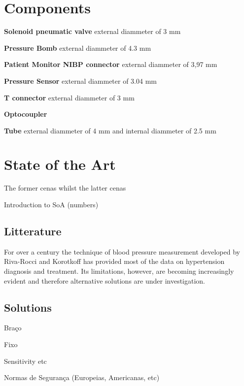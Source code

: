 \section{Components}

\textbf{Solenoid pneumatic valve}
external diammeter of 3 mm 

\textbf{Pressure Bomb}
external diammeter of 4.3 mm

\textbf{Patient Monitor NIBP connector}
external diammeter of 3,97 mm

\textbf{Pressure Sensor}
external diammeter of 3.04 mm

\textbf{T connector }
external diammeter of 3 mm

\textbf{Optocoupler}

\textbf{Tube}
external diammeter of 4 mm and internal diammeter of 2.5 mm


\section{State of the Art}

The former cenas whilst the latter cenas

Introduction to SoA (numbers)


\subsection{Litterature}

For over a century the technique of blood pressure measurement developed by Riva-Rocci and Korotkoff has provided most of the data on hypertension diagnosis and treatment. Its limitations, however, are becoming increasingly evident and therefore alternative solutions are under investigation.~\cite{review}

\subsection{Solutions}

Braço

Fixo

Sensitivity etc

Normas de Segurança (Europeias, Americanas, etc)

